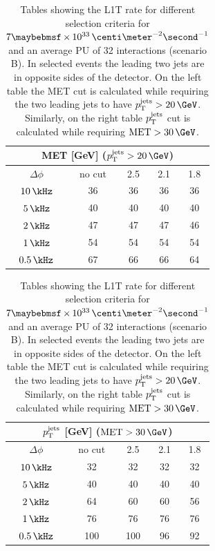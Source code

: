 \begin{table}[!htb]
\begin{minipage}{.5\linewidth}
  \centering
  \begin{tabular}{|c||c|c|c|c|}
  \hline
  \multicolumn{5}{|c|}{MET [GeV] ($\pt^{\text{jets}}>20\,\GeV$)} \\
  \hline\hline
  $\Delta\phi$ & no cut & 2.5 & 2.1 & 1.8 \\
  \hline
   $10\,\kHz$  &     36 &  36 &  36 &  36 \\
    $5\,\kHz$  &     40 &  40 &  40 &  40 \\
  \hline\hline
    $2\,\kHz$  &     47 &  47 &  47 &  46 \\
  \hline\hline
    $1\,\kHz$  &     54 &  54 &  54 &  54 \\
  $0.5\,\kHz$  &     67 &  66 &  66 &  64 \\
  \hline
  \end{tabular}
\end{minipage}%
  \begin{minipage}{.5\linewidth}
    \centering
  \begin{tabular}{|c||c|c|c|c|}
  \hline
  \multicolumn{5}{|c|}{$p_{\mathrm{T}}^{\text{jets}}$ [GeV] ($\text{MET}>30\,\GeV$)} \\
  \hline
  $\Delta\phi$ & no cut & 2.5 & 2.1 & 1.8 \\
  \hline\hline
   $10\,\kHz$  &     32 &  32 &  32 &  32 \\
    $5\,\kHz$  &     40 &  40 &  40 &  40 \\
  \hline\hline
    $2\,\kHz$  &     64 &  60 &  60 &  56 \\
  \hline\hline
    $1\,\kHz$  &     76 &  76 &  76 &  76 \\
  $0.5\,\kHz$  &    100 & 100 &  96 &  92 \\
  \hline
  \end{tabular}
\end{minipage} 
\caption[Tables showing the L1T rate for different selection criteria for $7 \times 10^{33}\,\centi\meter^{-2}\second^{-1}$ and an average PU of 32 interactions (scenario B).]
{Tables showing the \gls{L1T} rate for different selection criteria for $7 \times 10^{33}\,\centi\meter^{-2}\second^{-1}$ and an average \gls{PU} of 32 interactions (scenario B). In selected events the leading two jets are in opposite sides of the detector. On the left table the \gls{MET} cut is calculated while requiring the two leading jets to have $\pt^{\text{jets}} > 20\,\GeV$. Similarly, on the right table $p_{\mathrm{T}}^{\text{jets}}$ cut is calculated while requiring $\text{MET}>30\,\GeV$.}
\label{TABLE:ParkedDataAnalysis_L1TParkedTriggerDevelopment_Rate7E33}
\end{table}

